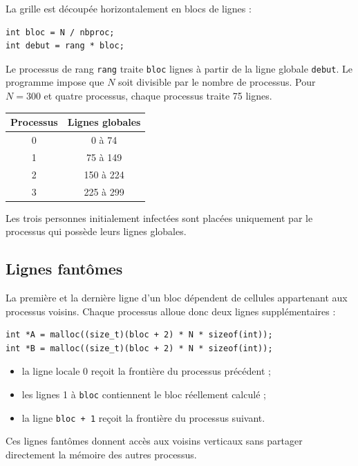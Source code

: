 \documentclass[a4paper,12pt]{article}
\begin{document}
La grille est découpée horizontalement en blocs de lignes :

\begin{lstlisting}
int bloc = N / nbproc;
int debut = rang * bloc;
\end{lstlisting}

Le processus de rang \texttt{rang} traite \texttt{bloc} lignes à partir de la
ligne globale \texttt{debut}. Le programme impose que $N$ soit divisible par
le nombre de processus. Pour $N=300$ et quatre processus, chaque processus
traite 75 lignes.

\begin{center}
\begin{tabular}{|c|c|}
	\hline
	\textbf{Processus} & \textbf{Lignes globales} \\ \hline
	0 & 0 à 74 \\ \hline
	1 & 75 à 149 \\ \hline
	2 & 150 à 224 \\ \hline
	3 & 225 à 299 \\ \hline
\end{tabular}
\end{center}

Les trois personnes initialement infectées sont placées uniquement par le
processus qui possède leurs lignes globales.

\subsection{Lignes fantômes}

La première et la dernière ligne d'un bloc dépendent de cellules appartenant
aux processus voisins. Chaque processus alloue donc deux lignes
supplémentaires :

\begin{lstlisting}
int *A = malloc((size_t)(bloc + 2) * N * sizeof(int));
int *B = malloc((size_t)(bloc + 2) * N * sizeof(int));
\end{lstlisting}

\begin{itemize}
	\item la ligne locale 0 reçoit la frontière du processus précédent ;
	\item les lignes 1 à \texttt{bloc} contiennent le bloc réellement calculé ;
	\item la ligne \texttt{bloc + 1} reçoit la frontière du processus suivant.
\end{itemize}

Ces lignes fantômes donnent accès aux voisins verticaux sans partager
directement la mémoire des autres processus.
\end{document}
